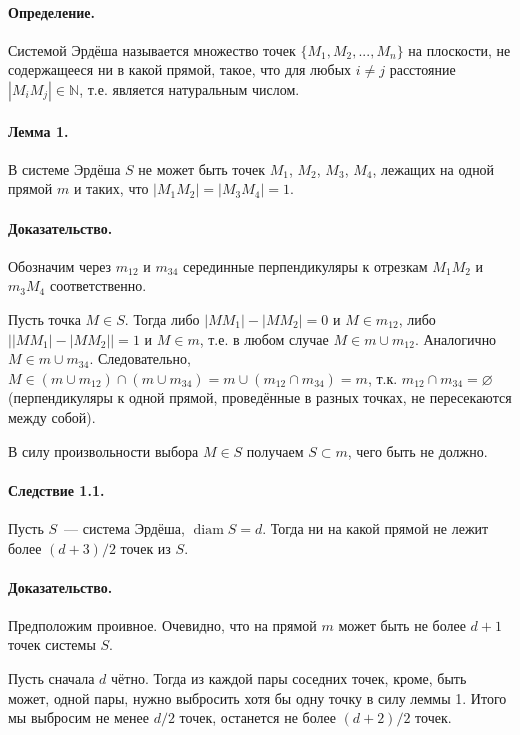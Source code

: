 
\paragraph{Определение.}
Системой Эрдёша называется множество точек $\{M_1, M_2, ..., M_n\}$ на плоскости, не содержащееся ни в какой прямой,
такое, что для любых $i\neq j$ расстояние $|M_i M_j| \in \mathbb{N}$,
т.е. является натуральным числом.

\paragraph{Лемма 1.}
В системе Эрдёша $S$ не может быть точек $M_1$, $M_2$, $M_3$, $M_4$,
лежащих на одной прямой $m$ и таких, что $|M_1 M_2| = |M_3 M_4| = 1$.

\paragraph{Доказательство.}
Обозначим через $m_{12}$ и $m_{34}$ серединные перпендикуляры к отрезкам $M_1 M_2$ и $m_3 M_4$ соответственно.

Пусть точка $M\in S$.
Тогда либо $|MM_1| - |MM_2| = 0$ и $M\in m_{12}$, либо $\left||MM_1| - |MM_2|\right| = 1$ и $M\in m$,
т.е. в любом случае $M\in m \cup m_{12}$.
Аналогично $M\in m \cup m_{34}$.
Следовательно, $M\in (m \cup m_{12}) \cap (m \cup m_{34}) = m \cup (m_{12} \cap m_{34}) = m$,
т.к. $m_{12} \cap m_{34} = \varnothing$ (перпендикуляры к одной прямой, проведённые в разных точках, не пересекаются между собой).

В силу произвольности выбора $M \in S$ получаем $S \subset m$, чего быть не должно.


\paragraph{Следствие 1.1.}
Пусть $S$~--- система Эрдёша, $\mathop{diam} S = d$.
Тогда ни на какой прямой не лежит более $(d+3)/2$ точек из $S$.

\paragraph{Доказательство.}
Предположим проивное.
Очевидно, что на прямой $m$ может быть не более $d+1$ точек системы $S$.

Пусть сначала $d$ чётно.
Тогда из каждой пары соседних точек, кроме, быть может, одной пары,
нужно выбросить хотя бы одну точку в силу леммы 1.
Итого мы выбросим не менее $d/2$ точек,
останется не более $(d+2)/2$ точек.


